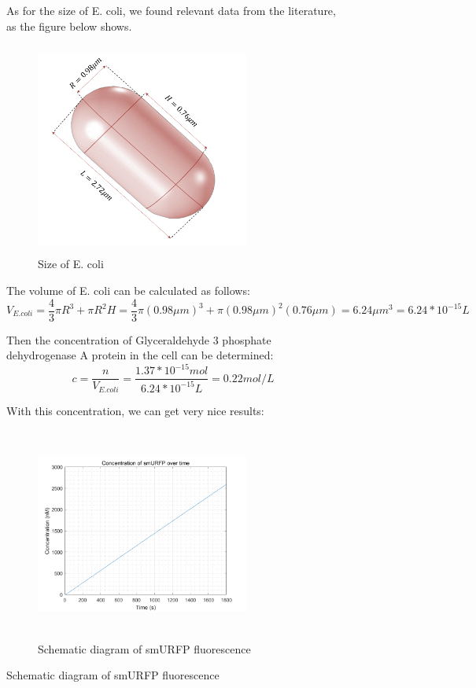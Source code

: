 \begin{figure}[H]
As for the size of E. coli, we found relevant data from the literature, as the figure below shows.\cite{grossman1982changes}

\begin{figure}[!htbp]
	\centering
	\includegraphics[width=7cm,height=7cm]{dc}
	\caption{Size of E. coli}
\end{figure}

The volume of E. coli can be calculated as follows:
\begin{displaymath}
	V_{E.coli}=\frac{4}{3} \pi R^3+\pi R^2H=\frac{4}{3} \pi (0.98\mu m)^3+\pi (0.98\mu m)^2(0.76\mu m)=6.24\mu m^3=6.24*10^{-15}L
\end{displaymath}

Then the concentration of Glyceraldehyde 3 phosphate dehydrogenase A protein in the cell can be determined:
\begin{displaymath}
	c=\frac{n}{V_{E.coli}}=\frac{1.37*10^{-15}mol}{6.24*10^{-15}L}=0.22mol/L
\end{displaymath}

With this concentration, we can get very nice results:

\begin{figure}[!htbp]
	\centering
	\includegraphics[width=7cm,height=7cm]{23}
	\caption{Schematic diagram of smURFP fluorescence}
\end{figure}


\end{figure}
